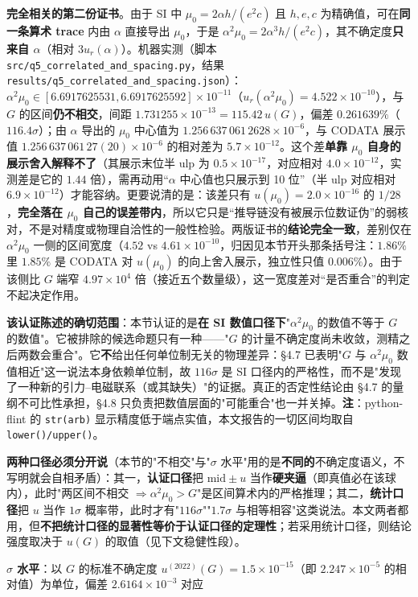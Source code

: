 \documentclass[12pt,a4paper]{article}
\begin{document}
\textbf{完全相关的第二份证书}。由于 SI 中 $\mu_0 = 2\alpha h/(e^2c)$ 且 $h,e,c$ 为精确值，可在\textbf{同一条算术 trace} 内由 $\alpha$ 直接导出 $\mu_0$，于是 $\alpha^2\mu_0 = 2\alpha^3 h/(e^2c)$，其不确定度\textbf{只来自 $\alpha$}（相对 $3u_r(\alpha)$）。机器实测（脚本 \texttt{src/q5\_\allowbreak{}correlated\_\allowbreak{}and\_\allowbreak{}spacing.py}，结果 \texttt{results/q5\_\allowbreak{}correlated\_\allowbreak{}and\_\allowbreak{}spacing.json}）：$\alpha^2\mu_0 \in [6.6917625531, 6.6917625592]\times10^{-11}$（$u_r(\alpha^2\mu_0) = 4.522\times10^{-10}$），与 $G$ 的区间\textbf{仍不相交}，间距 $1.731255\times10^{-13} = 115.42\,u(G)$，偏差 $0.261639\%$（$116.4\sigma$）；由 $\alpha$ 导出的 $\mu_0$ 中心值为 $1.256\,637\,061\,2628\times10^{-6}$，与 CODATA 展示值 $1.256\,637\,061\,27(20)\times10^{-6}$ 的相对差为 $5.7\times10^{-12}$。这个差\textbf{单靠 $\mu_0$ 自身的展示舍入解释不了}（其展示末位半 ulp 为 $0.5\times10^{-17}$，对应相对 $4.0\times10^{-12}$，实测差是它的 $1.44$ 倍），需再动用“$\alpha$ 中心值也只展示到 10 位”（半 ulp 对应相对 $6.9\times10^{-12}$）才能容纳。更要说清的是：该差只有 $u(\mu_0)=2.0\times10^{-16}$ 的 $1/28$，\textbf{完全落在 $\mu_0$ 自己的误差带内}，所以它只是“推导链没有被展示位数证伪”的弱核对，不是对精度或物理自洽性的一般性检验。两版证书的\textbf{结论完全一致}，差别仅在 $\alpha^2\mu_0$ 一侧的区间宽度（$4.52$ vs $4.61\times10^{-10}$，归因见本节开头那条括号注：$1.86\%$ 里 $1.85\%$ 是 CODATA 对 $u(\mu_0)$ 的向上舍入展示，独立性只值 $0.006\%$）。由于该侧比 $G$ 端窄 $4.97\times10^{4}$ 倍（接近五个数量级），这一宽度差对“是否重合”的判定不起决定作用。\par\medskip\noindent\textbf{该认证陈述的确切范围}：本节认证的是\textbf{在 SI 数值口径下}"$\alpha^2\mu_0$ 的数值不等于 $G$ 的数值"。它被排除的候选命题只有一种——"$G$ 的计量不确定度尚未收敛，测精之后两数会重合"。它\textbf{不}给出任何单位制无关的物理差异：§4.7 已表明"$G$ 与 $\alpha^2\mu_0$ 数值相近"这一说法本身依赖单位制，故 $116\sigma$ 是 SI 口径内的严格性，而不是"发现了一种新的引力--电磁联系（或其缺失）"的证据。真正的否定性结论由 §4.7 的量纲不可比性承担，§4.8 只负责把数值层面的"可能重合"也一并关掉。\textbf{注}：python-flint 的 \texttt{str(arb)} 显示精度低于端点实值，本文报告的一切区间均取自 \texttt{lower()/upper()}。\par\medskip\noindent\textbf{两种口径必须分开说}（本节的"不相交"与"$\sigma$ 水平"用的是\textbf{不同的}不确定度语义，不写明就会自相矛盾）：其一，\textbf{认证口径}把 $\mathrm{mid}\pm u$ 当作\textbf{硬夹逼}（即真值必在该球内），此时"两区间不相交 $\Rightarrow \alpha^2\mu_0 > G$"是区间算术内的严格推理；其二，\textbf{统计口径}把 $u$ 当作 $1\sigma$ 概率带，此时才有"$116\sigma$""$1.7\sigma$ 与相等相容"这类说法。本文两者都用，但\textbf{不把统计口径的显著性等价于认证口径的定理性}；若采用统计口径，则结论强度取决于 $u(G)$ 的取值（见下文稳健性段）。\par\medskip\noindent\textbf{$\sigma$ 水平}：以 $G$ 的标准不确定度 $u^{(2022)}(G)=1.5\times10^{-15}$（即 $2.247\times10^{-5}$ 的相对值）为单位，偏差 $2.6164\times10^{-3}$ 对应
\end{document}
